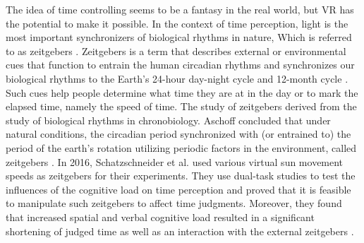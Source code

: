 \documentclass[sigconf]{acmart}
\begin{document}

The idea of time controlling seems to be a fantasy in the real world, but VR has the potential to make it possible. In the context of time perception, light is the most important synchronizers of biological rhythms in nature, Which is referred to as zeitgebers \cite{aschoff1965circadian, roenneberg2007human}. Zeitgebers is a term that describes external or environmental cues that function to entrain the human circadian rhythms and synchronizes our biological rhythms to the Earth's 24-hour day-night cycle and 12-month cycle \cite{aschoff1965circadian,pittendrigh1981circadian}. Such cues help people determine what time they are at in the day or to mark the elapsed time, namely the speed of time. The study of zeitgebers derived from the study of biological rhythms in chronobiology. Aschoff concluded that under natural conditions, the circadian period synchronized with (or entrained to) the period of the earth's rotation utilizing periodic factors in the environment, called zeitgebers \cite{aschoff1965circadian}. In 2016, Schatzschneider et al. used various virtual sun movement speeds as zeitgebers for their experiments. They use dual-task studies to test the influences of the cognitive load on time perception and proved that it is feasible to manipulate such zeitgebers to affect time judgments. Moreover, they found that increased spatial and verbal cognitive load resulted in a significant shortening of judged time as well as an interaction with the external zeitgebers \cite{schatzschneider2016turned}. 
\end{document}
